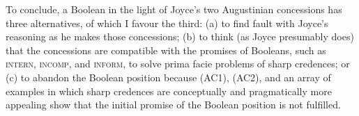 \documentclass[11pt]{article}
\begin{document}
To conclude, a Boolean in the light of Joyce's two Augustinian
concessions has three alternatives, of which I favour the third: (a)
to find fault with Joyce's reasoning as he makes those concessions;
(b) to think (as Joyce presumably does) that the concessions are
compatible with the promises of Booleans, such as \textsc{intern},
\textsc{incomp}, and \textsc{inform}, to solve prima facie problems of
sharp credences; or (c) to abandon the Boolean position because (AC1),
(AC2), and an array of examples in which sharp credences are
conceptually and pragmatically more appealing show that the initial
promise of the Boolean position is not fulfilled.

 

\end{document}
